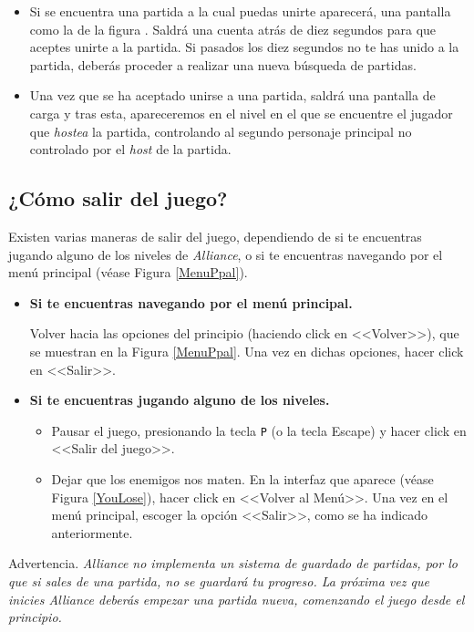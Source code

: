\begin{itemize}
\item Si se encuentra una partida a la cual puedas unirte aparecerá, una pantalla como la de la figura . Saldrá una cuenta atrás de diez segundos para que aceptes unirte a la partida. Si pasados los diez segundos no te has unido a la partida, deberás proceder a realizar una nueva búsqueda de partidas.

\item Una vez que se ha aceptado unirse a una partida, saldrá una pantalla de carga y tras esta, apareceremos en el nivel en el que se encuentre el jugador que \textit{hostea} la partida, controlando al segundo personaje principal no controlado por el \textit{host} de la partida.
\end{itemize}


\subsection{¿Cómo salir del juego?}

Existen varias maneras de salir del juego, dependiendo de si te encuentras jugando alguno de los niveles de \textit{Alliance}, o si te encuentras navegando por el menú principal (véase Figura \ref{MenuPpal}).

\begin{itemize}
\item \textbf{Si te encuentras navegando por el menú principal.}

Volver hacia las opciones del principio (haciendo click en <<Volver>>), que se muestran en la Figura \ref{MenuPpal}. Una vez en dichas opciones, hacer click en <<Salir>>.

\item \textbf{Si te encuentras jugando alguno de los niveles.}

\begin{itemize}
\item Pausar el juego, presionando la tecla \texttt{P} (o la tecla Escape) y hacer click en <<Salir del juego>>.
\item Dejar que los enemigos nos maten. En la interfaz que aparece (véase Figura \ref{YouLose}), hacer click en <<Volver al Menú>>. Una vez en el menú principal, escoger la opción <<Salir>>, como se ha indicado anteriormente. 
\end{itemize}
\end{itemize}

\renewcommand\bcStyleTitre[1]{\large\hspace*{1.8in}\textcolor{red!100}{#1}}
\begin{bclogo}[
  couleur=red!15,
  arrondi=0.25,
  logo=\hspace*{1in}\bctakecare,
  barre=none,
  noborder=true]{\hspace*{0.15in} Advertencia.}
\itshape \vspace*{0.15in}
\textit{Alliance} no implementa un sistema de guardado de partidas, por lo que si sales de una partida, no se guardará tu progreso. La próxima vez que inicies \textit{Alliance} deberás empezar una partida nueva, comenzando el juego desde el principio.
\end{bclogo}


